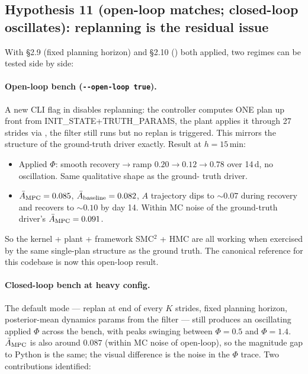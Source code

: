 \documentclass[11pt,a4paper]{article}
\begin{document}
\subsection{Hypothesis 11 (open-loop matches; closed-loop oscillates): replanning is the residual issue}

With \S2.9 (fixed planning horizon) and \S2.10 ()
both applied, two regimes can be tested side by side:

\paragraph{Open-loop bench (\texttt{-{}-open-loop true}).}
A new CLI flag in  disables
replanning: the controller computes ONE plan up front from
INIT\_STATE+TRUTH\_PARAMS, the plant applies it through 27 strides via
, the filter still runs but no replan is
triggered. This mirrors the structure of the ground-truth driver
 exactly. Result at
$h=15\,$min:
\begin{itemize}[itemsep=2pt]
\item Applied $\Phi$: smooth recovery$\to$ramp $0.20 \to 0.12 \to 0.78$
  over 14\,d, no oscillation. Same qualitative shape as the ground-
  truth driver.
\item $\bar A_{\rm MPC} = 0.085$, $\bar A_{\rm baseline} = 0.082$, $A$
  trajectory dips to ${\sim}0.07$ during recovery and recovers to
  ${\sim}0.10$ by day 14. Within MC noise of the ground-truth driver's
  $\bar A_{\rm MPC} = 0.091$.
\end{itemize}

So the kernel + plant + framework SMC$^2$ + HMC are all working when
exercised by the same single-plan structure as the ground truth. The
canonical reference for this codebase is now this open-loop result.

\paragraph{Closed-loop bench at heavy config.}
The default mode --- replan at end of every $K$ strides, fixed planning
horizon, posterior-mean dynamics params from the filter --- still
produces an oscillating applied $\Phi$ across the bench, with peaks
swinging between $\Phi = 0.5$ and $\Phi = 1.4$. $\bar A_{\rm MPC}$ is
also around $0.087$ (within MC noise of open-loop), so the magnitude
gap to Python is the same; the visual difference is the noise in the
$\Phi$ trace. Two contributions identified:
\end{document}

